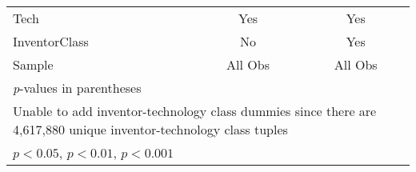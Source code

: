 {\begin{longtable}{l*{2}{c}}
Tech            &      Yes         &      Yes         \\
InventorClass   &       No         &      Yes         \\
Sample          &  All Obs         &  All Obs         \\
\hline\hline
\multicolumn{3}{l}{\footnotesize \textit{p}-values in parentheses}\\
\multicolumn{3}{l}{\footnotesize Unable to add inventor-technology class dummies since there are 4,617,880 unique inventor-technology class tuples}\\
\multicolumn{3}{l}{\footnotesize \sym{*} \(p<0.05\), \sym{**} \(p<0.01\), \sym{***} \(p<0.001\)}\\
\end{longtable}
}
